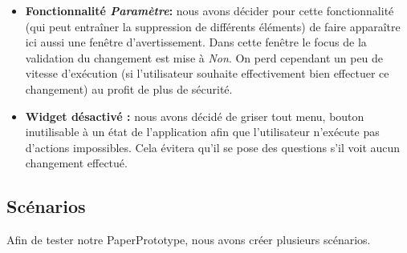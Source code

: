 \documentclass[a4paper,10pt]{article}
\begin{document}
\begin{itemize}
\item \textbf{Fonctionnalité \textit{Paramètre}:} nous avons décider pour cette fonctionnalité (qui peut entraîner la suppression de différents éléments) de faire apparaître ici aussi une fenêtre d'avertissement. Dans cette fenêtre le focus de la validation du changement est mise à \textit{Non}. On perd cependant un peu de vitesse d'exécution (si l'utilisateur souhaite effectivement bien effectuer ce changement) au profit de plus de sécurité.
\item \textbf{Widget désactivé :} nous avons décidé de griser tout menu, bouton inutilisable à un état de l'application afin que l'utilisateur n'exécute pas d'actions impossibles. Cela évitera qu'il se pose des questions s'il voit aucun changement effectué.
\end{itemize}

\subsection{Scénarios}
Afin de tester notre PaperPrototype, nous avons créer plusieurs scénarios.
\end{document}
